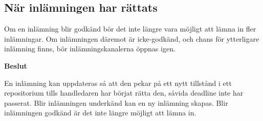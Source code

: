 \subsection{När inlämningen har rättats}
Om en inlämning blir godkänd bör det inte längre vara möjligt att lämna in fler inlämningar. Om inlämningen däremot är icke-godkänd, och chans för ytterligare inlämning finns, bör inlämningskanalerna öppnas igen.

\begin{flushright}

  \textbf{Beslut}
  
  \nopagebreak
  
  En inlämning kan uppdateras så att den pekar på ett nytt tillstånd i ett repositorium tills handledaren har börjat rätta den, såvida deadline inte har passerat. Blir inlämningen underkänd kan en ny inlämning skapas. Blir inlämningen godkänd är det inte längre möjligt att lämna in.
\end{flushright}
